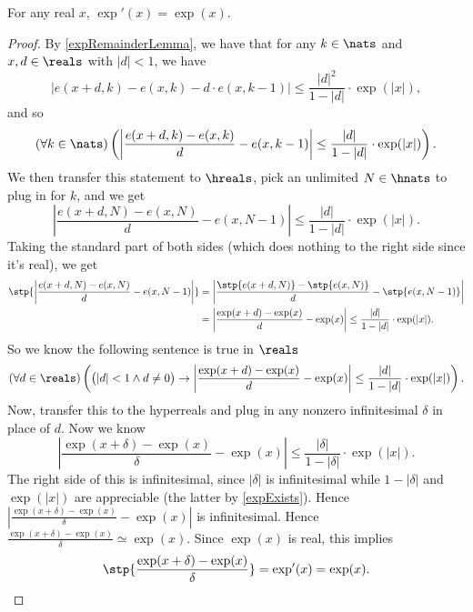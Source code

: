 \begin{thm}
    For any real $x$, $\exp'(x) = \exp(x)$.
\end{thm}

\begin{proof}
    By \autoref{expRemainderLemma}, we have that for any $k \in \nats$ and $x, d \in \reals$ with $|d| < 1$, we have
    \[ 
    |e(x + d, k) - e(x, k) - d\cdot e(x, k-1)| \leq \frac{|d|^2}{1 - |d|} \cdot \exp(|x|), 
    \]
    and so
    \[
    (\forall k \in \nats)\left(\left|\frac{e(x + d, k) - e(x, k)}{d} - e(x, k - 1)\right| \leq \frac{|d|}{1 - |d|} \cdot \exp(|x|)\right).
    \]
    We then transfer this statement to $\hreals$, pick an unlimited $N \in \hnats$ to plug in for $k$, and we get
    \[
    \left|\frac{e(x + d, N) - e(x, N)}{d} - e(x, N - 1)\right| \leq \frac{|d|}{1-|d|} \cdot \exp(|x|).
    \]
    Taking the standard part of both sides (which does nothing to the right side since it's real), we get
    \begin{align*}
    \stp{\left|\frac{e(x + d, N) - e(x, N)}{d} - e(x, N - 1)\right|} &= \left|\frac{\stp{e(x + d, N)} - \stp{e(x, N)}}{d} - \stp{e(x, N - 1)}\right| \\
        &= \left|\frac{\exp(x + d) - \exp(x)}{d} - \exp(x)\right| \leq \frac{|d|}{1-|d|} \cdot \exp(|x|).
    \end{align*}
    So we know the following sentence is true in $\reals$
    \[
    (\forall d \in \reals)\left(\big(|d| < 1 \land d \neq 0\big) \to \left|\frac{\exp(x + d) - \exp(x)}{d} - \exp(x)\right| \leq \frac{|d|}{1-|d|} \cdot \exp(|x|)\right).
    \]
    Now, transfer this to the hyperreals and plug in any nonzero infinitesimal $\delta$ in place of $d$. Now we know
    \[
    \left|\frac{\exp(x + \delta) - \exp(x)}{\delta} - \exp(x)\right| \leq \frac{|\delta|}{1-|\delta|} \cdot \exp(|x|).
    \]
    The right side of this is infinitesimal, since $|\delta|$ is infinitesimal while $1 - |\delta|$ and $\exp(|x|)$ are appreciable (the latter by \autoref{expExists}). Hence $\left|\frac{\exp(x + \delta) - \exp(x)}{\delta} - \exp(x)\right|$ is infinitesimal. Hence $\frac{\exp(x + \delta) - \exp(x)}{\delta} \simeq \exp(x)$. Since $\exp(x)$ is real, this implies
    \[
    \stp{\frac{\exp(x + \delta) - \exp(x)}{\delta}} = \exp'(x) = \exp(x).
    \]
\end{proof}